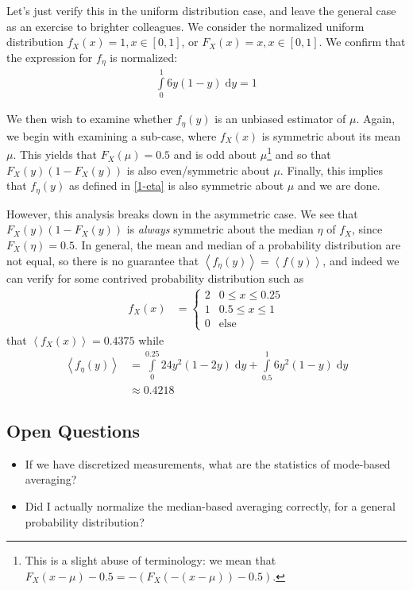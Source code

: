\documentclass[10pt]{article}
\newcommand{\expvalue}[1]{\left<#1\right>}
\begin{document}
Let's just verify this in the uniform distribution case, and leave the general
case as an exercise to brighter colleagues. We consider the normalized uniform
distribution $f_X(x) = 1, x \in [0,1]$, or $F_X(x) = x, x \in [0,1]$. We confirm
that the expression for $f_\eta$ is normalized:
\begin{align}
    \int\limits_{0}^{1}6y(1-y)\;\mathrm{d}y = 1
\end{align}

We then wish to examine whether $f_\eta(y)$ is an unbiased estimator of $\mu$.
Again, we begin with examining a sub-case, where $f_X(x)$ is symmetric about its
mean $\mu$. This yields that $F_X(\mu) = 0.5$ and is odd about
$\mu$\footnote{This is a slight abuse of terminology: we mean that $F_X(x - \mu)
- 0.5 = -(F_X(-(x-\mu)) - 0.5)$.} and so that $F_X(y)\left( 1 - F_X(y) \right)$
is also even/symmetric about $\mu$. Finally, this implies that $f_\eta(y)$ as
defined in \autoref{1-eta} is also symmetric about $\mu$ and we are done.

However, this analysis breaks down in the asymmetric case. We see that
$F_X(y)\left( 1 - F_X(y) \right)$ is \emph{always} symmetric about the
median $\eta$ of $f_X$, since $F_X(\eta) = 0.5$. In general, the mean and median
of a probability distribution are not equal, so there is no guarantee that
$\expvalue{f_\eta(y)} = \expvalue{f(y)}$, and indeed we can verify for some
contrived probability distribution such as
\begin{align}
    f_X(x) &=
    \begin{cases}
        2 & 0 \leq x \leq 0.25\\
        1 & 0.5 \leq x \leq 1\\
        0 & \text{else}
    \end{cases}
\end{align}
that $\expvalue{f_X(x)} = 0.4375$ while
\begin{align}
    \expvalue{f_\eta(y)} &= \int\limits_{0}^{0.25}24y^2(1-2y)\;\mathrm{d}y +
    \int\limits_{0.5}^{1}6y^2(1-y)\;\mathrm{d}y\\
    &\approx 0.4218
\end{align}

\subsection{Open Questions}

\begin{itemize}
    \item If we have discretized measurements, what are the statistics of
        mode-based averaging?
    \item Did I actually normalize the median-based averaging correctly, for a
        general probability distribution?
\end{itemize}
\end{document}
